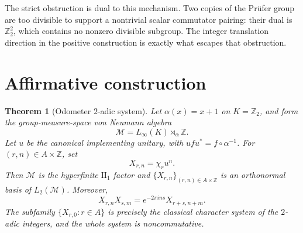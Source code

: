 \documentclass[11pt]{article}
\newtheorem{theorem}{Theorem}
\theoremstyle{definition}
\theoremstyle{remark}
\newcommand{\Z}{\mathbb Z}
\newcommand{\M}{\mathcal M}
\newcommand{\1}{\mathbf 1}
\begin{document}
The strict obstruction is dual to this mechanism.  Two copies of the Pr\"ufer
group are too divisible to support a nontrivial scalar commutator pairing:
their dual is $\Z_2^2$, which contains no nonzero divisible subgroup.  The
integer translation direction in the positive construction is exactly what
escapes that obstruction.

\section{Affirmative construction}

\begin{theorem}[Odometer $2$-adic system]\label{thm:positive}
Let $\alpha(x)=x+1$ on $K=\Z_2$, and form the group-measure-space von Neumann
algebra
\[
 \M=L_\infty(K)\rtimes_\alpha\Z.
\]
Let $u$ be the canonical implementing unitary, with
$ufu^*=f\circ\alpha^{-1}$.  For $(r,n)\in A\times\Z$, set
\[
 X_{r,n}=\chi_r u^n.
\]
Then $\M$ is the hyperfinite $\mathrm{II}_1$ factor and
$\{X_{r,n}\}_{(r,n)\in A\times\Z}$ is an orthonormal basis of $L_2(\M)$.
Moreover,
\begin{equation}\label{eq:product}
 X_{r,n}X_{s,m}=e^{-2\pi i ns}X_{r+s,n+m}.
\end{equation}
The subfamily $\{X_{r,0}:r\in A\}$ is precisely the classical character
system of the $2$-adic integers, and the whole system is noncommutative.
\end{theorem}
\end{document}
